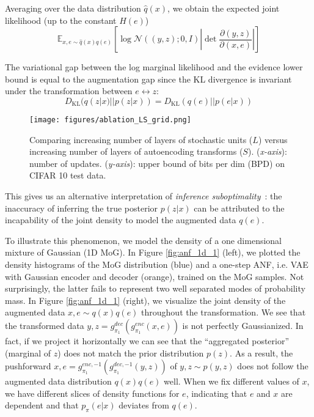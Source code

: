 \documentclass{article}
\def\gN{{\mathcal{N}}}
\newcommand{\E}{\mathbb{E}}
\newcommand{\KL}{D_{\mathrm{KL}}}
\begin{document}
Averaging over the data distribution $\hat{q}(x)$, we obtain the expected joint likelihood (up to the constant $H(e)$)
$$\E_{x,e\sim \hat{q}(x)q(e)}\left[\log\gN((y,z); 0,I)\left|\det\frac{\partial (y,z)}{\partial (x,e)}\right|\right]$$

The variational gap between the log marginal likelihood and the evidence lower bound is equal to the augmentation gap since the KL divergence is invariant under the transformation between $e\longleftrightarrow z$:
$$\KL(q(z|x)||p(z|x)) = \KL(q(e)||p(e|x))$$


\begin{figure}
    \centering
    \texttt{[image: figures/ablation\_LS\_grid.png]}
    \vspace{-7mm}
    \caption{\small Comparing increasing number of layers of stochastic units ($L$) versus increasing number of layers of autoencoding transforms ($S$). (\emph{x-axis}): number of updates. (\emph{y-axis}): upper bound of bits per dim (BPD) on CIFAR 10 test data.
    }
    \label{fig:layers}
\end{figure}


This gives us an alternative interpretation of \emph{inference suboptimality}~\citep{cremer2018inference}: the inaccuracy of inferring the true posterior $p(z|x)$ can be attributed to the incapability of the joint density to model the augmented data $q(e)$. 

To illustrate this phenomenon, we model the density of a one dimensional mixture of Gaussian (1D MoG).
In Figure \ref{fig:anf_1d_1} (left), we plotted the density histograms of the MoG distribution (blue) and a one-step ANF, i.e. VAE with Gaussian encoder and decoder (orange), trained on the MoG samples. 
Not surprisingly, the latter fails to represent two well separated modes of probability mass. 
In Figure \ref{fig:anf_1d_1} (right), we visualize the joint density of the augmented data $x,e\sim q(x)q(e)$ throughout the transformation. 
We see that the transformed data $y,z=g^{dec}_{\pi_1}(g^{enc}_{\pi_1}(x,e))$ is not perfectly Gaussianized.
In fact, if we project it horizontally we can see that the ``aggregated posterior'' (marginal of $z$) does not match the prior distribution $p(z)$. 
As a result, the pushforward $x,e=g^{enc, -1}_{\pi_1}(g^{dec, -1}_{\pi_1}(y,z))$ of $y,z\sim p(y,z)$ does not follow the augmented data distribution $q(x)q(e)$ well. 
When we fix different values of $x$, we have different slices of density functions for $e$, indicating that $e$ and $x$ are dependent and that $p_\pi(e|x)$ deviates from $q(e)$. 
\end{document}
